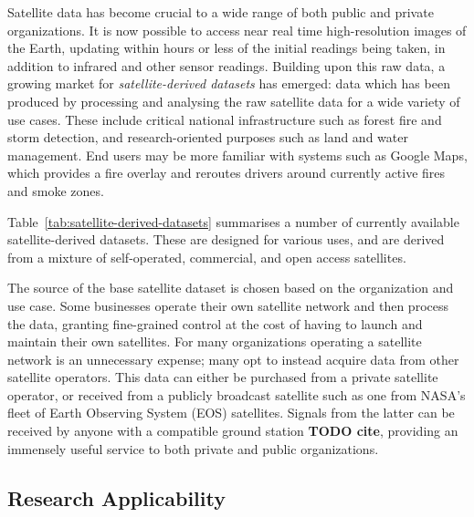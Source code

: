Satellite data has become crucial to a wide range of both public and private organizations.
It is now possible to access near real time high-resolution images of the Earth, updating within hours or less of the initial readings being taken, in addition to infrared and other sensor readings.
Building upon this raw data, a growing market for \textit{satellite-derived datasets} has emerged: data which has been produced by processing and analysing the raw satellite data for a wide variety of use cases. %
These include critical national infrastructure such as forest fire and storm detection, and research-oriented purposes such as land and water management.
End users may be more familiar with systems such as Google Maps, which provides a fire overlay and reroutes drivers around currently active fires and smoke zones.

Table~\ref{tab:satellite-derived-datasets} summarises a number of currently available satellite-derived datasets.
These are designed for various uses, and are derived from a mixture of self-operated, commercial, and open access satellites.

The source of the base satellite dataset is chosen based on the organization and use case.
Some businesses operate their own satellite network and then process the data, granting fine-grained control at the cost of having to launch and maintain their own satellites.
For many organizations operating a satellite network is an unnecessary expense; many opt to instead acquire data from other satellite operators.
This data can either be purchased from a private satellite operator, or received from a publicly broadcast satellite such as one from NASA's fleet of Earth Observing System (EOS) satellites.
Signals from the latter can be received by anyone with a compatible ground station \textbf{TODO cite}, providing an immensely useful service to both private and public organizations.



\subsection{Research Applicability}

